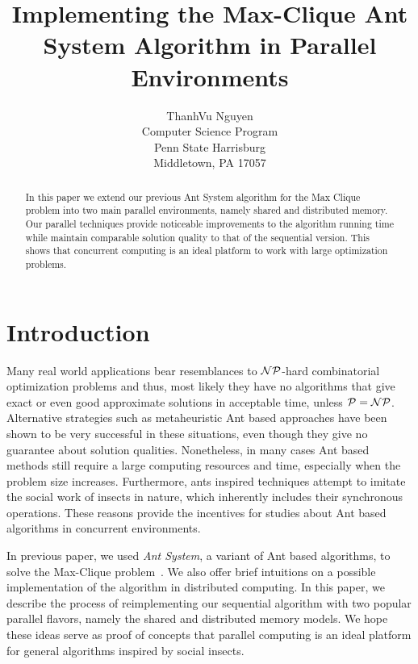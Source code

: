 \documentclass[11pt]{article}
\begin{document}
  

\title{Implementing the Max-Clique Ant System Algorithm in Parallel Environments} 
\author{ 
ThanhVu Nguyen\\ 
Computer Science Program\\ 
Penn State Harrisburg\\ 
Middletown, PA 17057\\ 
}  
\maketitle  


\begin{abstract}
In this paper we extend our previous Ant System algorithm for the Max Clique problem into two main parallel environments, namely shared and distributed memory. Our parallel techniques provide noticeable improvements to the algorithm running time while maintain comparable solution quality to that of the sequential version.  This shows that concurrent computing is an ideal platform to work with large optimization problems.
\end{abstract}


\section{Introduction}\label{intro}


Many real world applications bear resemblances to  $\cal NP$-hard combinatorial optimization problems and thus, most likely they have no algorithms that give exact or even good approximate solutions in acceptable time, unless $\cal P = NP$.  Alternative strategies such as metaheuristic Ant based approaches have been shown to be very successful in these situations, even though they give no guarantee about solution qualities.  Nonetheless, in many cases Ant based methods still require a large computing resources and time, especially when the problem size increases.  Furthermore, ants inspired techniques attempt to imitate the social work of insects in nature, which inherently includes their synchronous operations.  These reasons provide the incentives for studies about Ant based algorithms in concurrent environments.

In previous paper, we used \textit{Ant System}, a variant of Ant based algorithms, to solve the Max-Clique problem~\cite{BR}. We also offer brief intuitions on a possible implementation of the algorithm in distributed computing.  In this paper, we describe the process of reimplementing our sequential algorithm with two popular parallel flavors, namely the shared and distributed memory models. We hope these ideas serve as proof of concepts that parallel computing is an ideal platform for general algorithms inspired by social insects.
\end{document}
